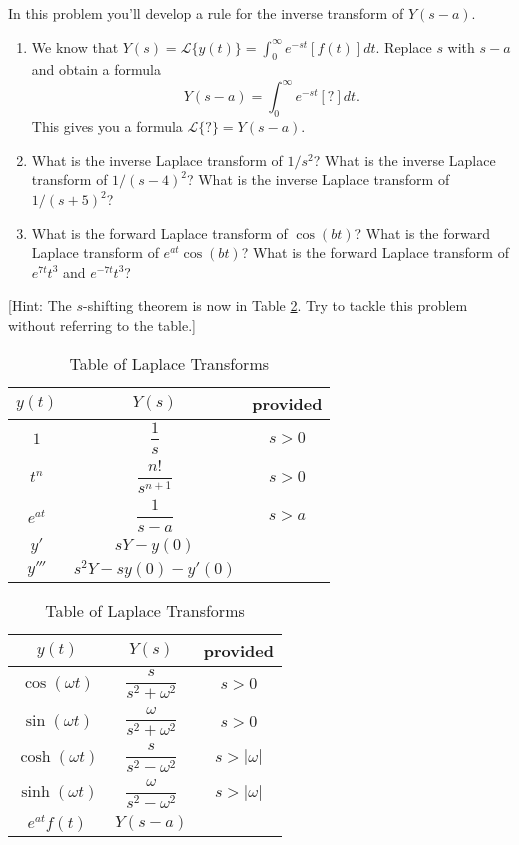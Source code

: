 \begin{problem}
 In this problem you'll develop a rule for the inverse transform of $Y(s-a)$. 
\begin{enumerate}
 \item  We know that $Y(s) = \mathscr{L}\{y(t)\} = \int_0^\infty e^{-st}[f(t)]dt$.  Replace $s$ with $s-a$ and obtain a formula
$$Y(s-a) = \int_0^\infty e^{-st}[?] dt.$$ This gives you a formula $\mathscr{L}\{?\} = Y(s-a)$.
 \item What is the inverse Laplace transform of $1/s^2$?  What is the inverse Laplace transform of $1/(s-4)^2$? What is the inverse Laplace transform of $1/(s+5)^2$?
 \item What is the forward Laplace transform of $\cos(bt)$? What is the forward Laplace transform of $e^{at} \cos (bt)$? What is the forward Laplace transform of $e^{7t}t^3$ and $e^{-7t}t^3$?
\end{enumerate}
[Hint: The $s$-shifting theorem is now in Table \ref{laplacetable2}.  Try to tackle this problem without referring to the table.]
\end{problem}

\begin{table}
\begin{center}
\begin{tabular}[t]{|c|cc|}
\hline
$y(t)$ & $Y(s)$ & provided\\
\hline\hline
$1$					&$\dfrac{1}{s}$ 							&$s>0$\\\hline
$t^n$				&$\dfrac{n!}{s^{n+1}}$ 			&$s>0$\\\hline
$e^{at}$		&$\dfrac{1}{s-a}$ 			&$s>a$\\\hline
$y'$					&$sY-y(0)$ 						&\\\hline
$y'''$					&$s^2Y-sy(0)-y'(0)$ 						&\\\hline
\end{tabular}
\quad
\begin{tabular}[t]{|c|cc|}
\hline
$y(t)$ & $Y(s)$ & provided\\
\hline\hline
$\cos(\omega t)$  &$\dfrac{s}{s^2+\omega^2}$ 			&$s>0$\\\hline
$\sin(\omega t)$  &$\dfrac{\omega}{s^2+\omega^2}$ 			&$s>0$\\\hline
$\cosh(\omega t)$ &$\dfrac{s}{s^2-\omega^2}$ 			&$s>|\omega|$\\\hline
$\sinh(\omega t)$ &$\dfrac{\omega}{s^2-\omega^2}$ 			&$s>|\omega|$\\\hline
$e^{at}f(t)$  &$Y(s-a)$ 						&\\\hline
\end{tabular}

\caption{Table of Laplace Transforms}
\label{laplacetable2}
\end{center}
\end{table}


